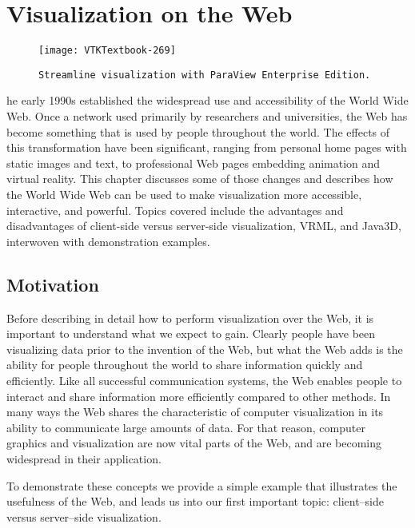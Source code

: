 \chapter{Visualization on the Web}
\label{chap:visualization_web}

\begin{figure}[ht]
	\hfill
	\begin{minipage}{0.5\textwidth}
		\centering
		\texttt{[image: VTKTextbook-269]}
		\caption*{\texttt{Streamline visualization with ParaView Enterprise Edition.}}
	\end{minipage}
\end{figure}


he early 1990s established the widespread use and accessibility of the World Wide Web.
Once a network used primarily by researchers and universities, the Web has become something that is used by people throughout the world.
The effects of this transformation have been significant, ranging from personal home pages with static images and text, to professional Web pages embedding animation and virtual reality.
This chapter discusses some of those changes and describes how the World Wide Web can be used to make visualization more accessible, interactive, and powerful.
Topics covered include the advantages and disadvantages of client-side versus server-side visualization, VRML, and Java3D, interwoven with demonstration examples.

\section{Motivation}
Before describing in detail how to perform visualization over the Web, it is important to understand what we expect to gain. Clearly people have been visualizing data prior to the invention of the Web, but what the Web adds is the ability for people throughout the world to share information quickly and efficiently.
Like all successful communication systems, the Web enables people to interact and share information more efficiently compared to other methods.
In many ways the Web shares the characteristic of computer visualization in its ability to communicate large amounts of data.
For that reason, computer graphics and visualization are now vital parts of the Web, and are becoming widespread in their application.

To demonstrate these concepts we provide a simple example that illustrates the usefulness of the Web, and leads us into our first important topic: client--side versus server--side visualization.

